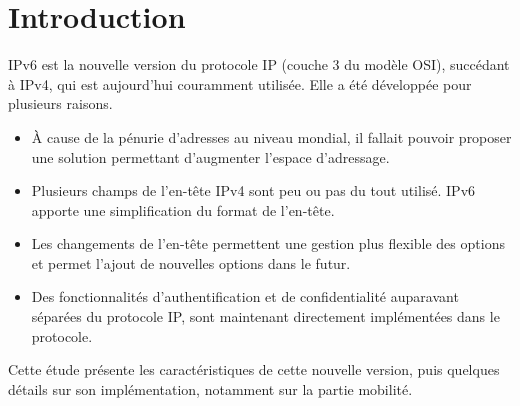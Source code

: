\section{Introduction}

IPv6 est la nouvelle version du protocole IP (couche 3 du modèle OSI), succédant à IPv4, qui est aujourd'hui couramment utilisée.
Elle a été développée pour plusieurs raisons.
\begin{itemize}
  \item À cause de la pénurie d’adresses au niveau mondial, il fallait pouvoir proposer une solution permettant d'augmenter l'espace d'adressage.
  \item Plusieurs champs de l'en-tête IPv4 sont peu ou pas du tout utilisé. IPv6 apporte une simplification du format de l'en-tête.
  \item Les changements de l'en-tête permettent une gestion plus flexible des options et permet l'ajout de nouvelles options dans le futur.
  \item Des fonctionnalités d'authentification et de confidentialité auparavant séparées du protocole IP, sont maintenant directement implémentées dans le protocole.
\end{itemize}
  
Cette étude présente les caractéristiques de cette nouvelle version, puis quelques détails sur son implémentation, notamment sur la partie mobilité.
  
